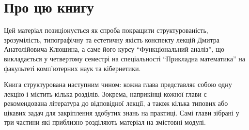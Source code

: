 \section*{Про цю книгу}

Цей матеріал позиціонується як спроба покращити
структурованість, зрозумілість,
типографічну та естетичну якість
конспекту лекцій
Дмитра Анатолійовича Клюшина,
а саме його курсу ``Функціональний аналіз'',
що викладається у четвертому семестрі
на спеціальності ``Прикладна математика''
на факультеті комп'ютер\-них наук та кібернетики.

Книга структурована наступним чином:
кожна глава представляє собою одну лекцію
і містить кілька розділів.
Зокрема, наприкінці кожної глави
є рекомендована література до відповідної лекції,
а також кілька типових або цікавих задач
для закріплення здобутих знань на практиці.
Самі глави зібрані у три частини
які приблизно розділяють матеріал на змістовні модулі.
